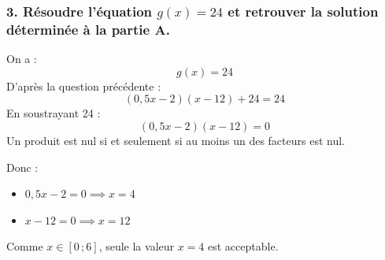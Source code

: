 \documentclass[a4paper,11pt]{article}
\begin{document}

\bigskip

\subsubsection*{3. Résoudre l’équation $g(x) = 24$ et retrouver la solution déterminée à la partie A.}

On a :
\[
g(x) = 24
\]
D'après la question précédente :
\[
(0{,}5x - 2)(x - 12) + 24 = 24
\]
En soustrayant 24 :
\[
(0{,}5x - 2)(x - 12) = 0
\]
Un produit est nul si et seulement si au moins un des facteurs est nul.

Donc :
\begin{itemize}
    \item $0{,}5x - 2 = 0 \implies x = 4$
    \item $x - 12 = 0 \implies x = 12$
\end{itemize}
Comme $x \in [0\,;6]$, seule la valeur $x = 4$ est acceptable.

\end{document}

